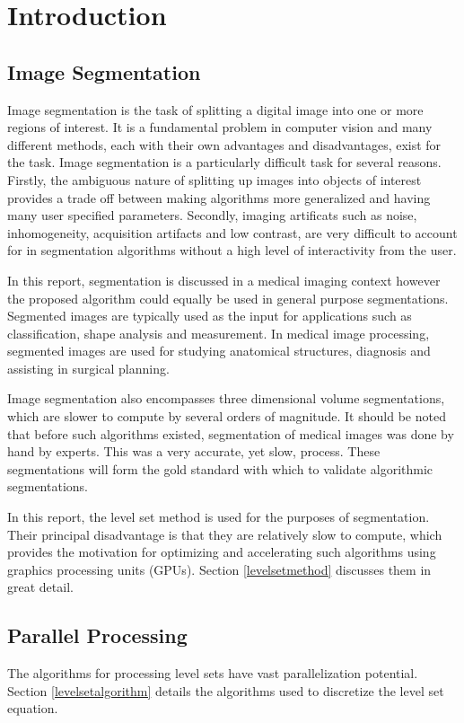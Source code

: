 \chapter{Introduction}

\section{Image Segmentation}
Image segmentation is the task of splitting a digital image into one or more regions of interest. It is a fundamental problem in computer vision and many different methods, each with their own advantages and disadvantages, exist for the task. Image segmentation is a particularly difficult task for several reasons. Firstly, the ambiguous nature of splitting up images into objects of interest provides a trade off between making algorithms more generalized and having many user specified parameters. Secondly, imaging artificats such as noise, inhomogeneity, acquisition artifacts and low contrast, are very difficult to account for in segmentation algorithms without a high level of interactivity from the user. 

In this report, segmentation is discussed in a medical imaging context however the proposed algorithm could equally be used in general purpose segmentations. Segmented images are typically used as the input for applications such as classification, shape analysis and measurement. In medical image processing, segmented images are used for studying anatomical structures, diagnosis and assisting in surgical planning.

Image segmentation also encompasses three dimensional volume segmentations, which are slower to compute by several orders of magnitude. It should be noted that before such algorithms existed, segmentation of medical images was done by hand by experts. This was a very accurate, yet slow, process. These segmentations will form the gold standard with which to validate algorithmic segmentations.

In this report, the level set method is used for the purposes of segmentation. Their principal disadvantage is that they are relatively slow to compute, which provides the motivation for optimizing and accelerating such algorithms using graphics processing units (GPUs). Section \ref{levelsetmethod} discusses them in great detail.



\section{Parallel Processing}
The algorithms for processing level sets have vast parallelization potential. Section \ref{levelsetalgorithm} details the algorithms used to discretize the level set equation.
